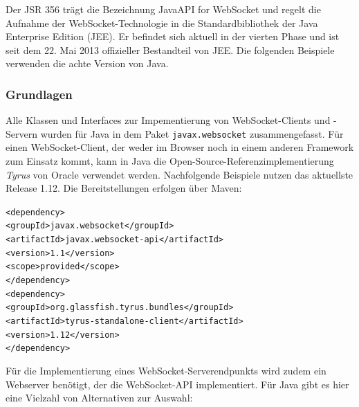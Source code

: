 \documentclass[11pt,a4paper,titlepage]{scrartcl}
\numberwithin{equation}{section}
\begin{document}
\noindent Der JSR 356 trägt die Bezeichnung Java\texttrademark API for WebSocket und regelt die Aufnahme der WebSocket-Technologie in die Standardbibliothek der Java Enterprise Edition (JEE). Er befindet sich aktuell in der vierten Phase und ist seit dem 22. Mai 2013 offizieller Bestandteil von JEE. Die folgenden Beispiele verwenden die achte Version von Java.

\subsubsection{Grundlagen}
Alle Klassen und Interfaces zur Impementierung von WebSocket-Clients und -Servern wurden für Java in dem Paket \texttt{javax.websocket} zusammengefasst. Für einen WebSocket-Client, der weder im Browser noch in einem anderen Framework zum Einsatz kommt, kann in Java die Open-Source-Referenzimplementierung \textit{Tyrus} von Oracle verwendet werden. Nachfolgende Beispiele nutzen das aktuellste Release 1.12. Die Bereitstellungen erfolgen über Maven: 
\vspace{-5mm}
\begin{center}\parbox{0pt}{
	\begin{tabbing}
		\texttt{<depen}\=\texttt{dency>}\\
		\>\texttt{<groupId>javax.websocket</groupId>}\\
		\>\texttt{<artifactId>javax.websocket-api</artifactId>}\\
		\>\texttt{<version>1.1</version>}\\
		\>\texttt{<scope>provided</scope>}\\
		\texttt{</dependency>}\\
		\texttt{<dependency>}\\
		\>\texttt{<groupId>org.glassfish.tyrus.bundles</groupId>}\\
		\>\texttt{<artifactId>tyrus-standalone-client</artifactId>}\\
		\>\texttt{<version>1.12</version>}\\
		\texttt{</dependency>}
	\end{tabbing}}
\end{center}
\noindent Für die Implementierung eines WebSocket-Serverendpunkts wird zudem ein Webserver benötigt, der die WebSocket-API implementiert. Für Java gibt es hier eine Vielzahl von Alternativen zur Auswahl:

\begin{itemize}
\end{itemize}
\end{document}
